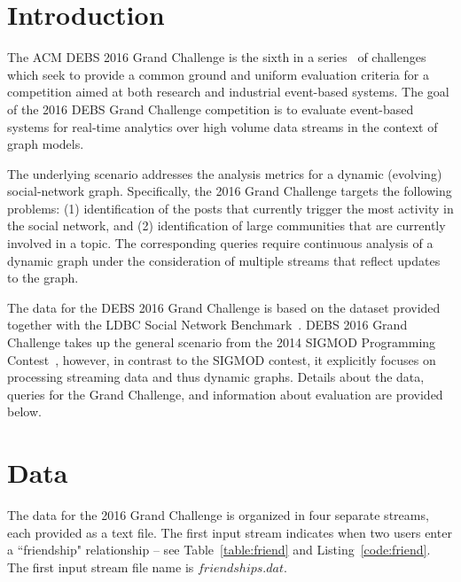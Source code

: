\documentclass{sig-alternate}
\begin{document}

\section{Introduction}
\label{sec:introduction}
The ACM DEBS 2016 Grand Challenge is the sixth in a series~\cite{jerzak2012debs, mutschler2013debs, jerzak2014debs, jerzak2015debs} of challenges which seek to provide a common ground and uniform evaluation criteria for a competition aimed at both research and industrial event-based systems. The goal of the 2016 DEBS Grand Challenge competition is to evaluate event-based systems for real-time analytics over high volume data streams in the context of graph models.

The underlying scenario addresses the analysis metrics for a dynamic (evolving) social-network graph. Specifically, the 2016 Grand Challenge targets the following problems: (1) identification of the posts that currently trigger the most activity in the social network, and (2) identification of large communities that are currently involved in a topic. The corresponding queries require continuous analysis of a dynamic graph under the consideration of multiple streams that reflect updates to the graph.

The data for the DEBS 2016 Grand Challenge is based on the dataset provided together with the LDBC Social Network Benchmark~\cite{erling2015social}. DEBS 2016 Grand Challenge takes up the general scenario from the 2014 SIGMOD Programming Contest~\cite{DBLP:conf/sigmod/2014}, however, in contrast to the SIGMOD contest, it explicitly focuses on processing streaming data and thus dynamic graphs. Details about the data, queries for the Grand Challenge, and information about evaluation are provided below.

\section{Data}
\label{sec:data}
The data for the 2016 Grand Challenge is organized in four separate streams, each provided as a text file. The first input stream indicates when two users enter a ``friendship" relationship -- see Table~\ref{table:friend} and Listing~\ref{code:friend}. The first input stream file name is $friendships.dat$.

\end{document}
